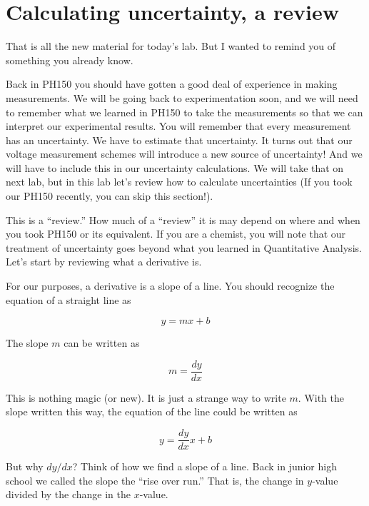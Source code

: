 \section{Calculating uncertainty, a review}

That is all the new material for today's lab. But I wanted to remind you of
something you already know.

Back in PH150 you should have gotten a good deal of experience in making
measurements. We will be going back to experimentation soon, and we will
need to remember what we learned in PH150 to take the measurements so that
we can interpret our experimental results. You will remember that every
measurement has an uncertainty. We have to estimate that uncertainty. It
turns out that our voltage measurement schemes will introduce a new source
of uncertainty! And we will have to include this in our uncertainty
calculations. We will take that on next lab, but in this lab let's review
how to calculate uncertainties (If you took our PH150 recently, you can skip this section!).

This is a ``review.'' How much of a ``review'' it is may depend on where and when you took PH150 or its equivalent. If you are a chemist, you will note that our treatment of uncertainty goes beyond what you learned in Quantitative Analysis. Let's start by reviewing what a derivative is.

For our purposes, a derivative is a slope of a line. You should recognize the equation of a straight line as

\begin{equation*}
	y=mx+b
\end{equation*}

The slope $m$ can be written as 

\begin{equation*}
	m=\frac{dy}{dx}
\end{equation*}

This is nothing magic (or new). It is just a strange way to write $m.$ With the slope written this way, the equation of the line could be written as 

\begin{equation*}
	y=\frac{dy}{dx}x+b
\end{equation*}

But why $dy/dx$? Think of how we find a slope of a line. Back in junior high
school we called the slope the ``rise over run.'' That is, the change in $y$-value divided by the
change in the $x$-value.

